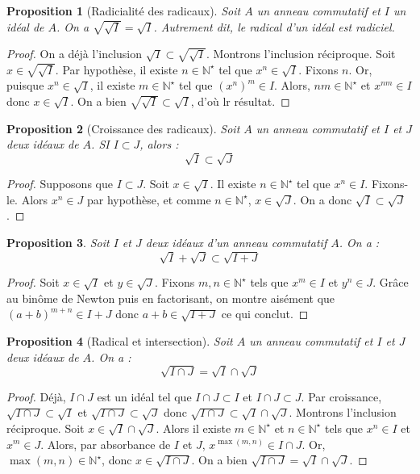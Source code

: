 \documentclass[french]{book}
\newcommand{\N}{\mathbb{N}}
\newcommand{\st}{^\star}
\theoremstyle{plain}
\newtheorem{prop}{Proposition}[chapter]
\theoremstyle{definition}
\theoremstyle{remark}
\begin{document}
\begin{prop}[Radicialité des radicaux]
	Soit $A$ un anneau commutatif et $I$ un idéal de $A$. On a $\sqrt{\sqrt{I}}=\sqrt{I}$. Autrement dit, le radical d'un idéal est radiciel.
\end{prop}
\begin{proof}
	On a déjà l'inclusion $\sqrt{I}\subset\sqrt{\sqrt{I}}$. Montrons l'inclusion réciproque. Soit $x\in\sqrt{\sqrt{I}}$. Par hypothèse, il existe $n\in\N\st$ tel que $x^n\in\sqrt{I}$. Fixons $n$. Or, puisque $x^n\in\sqrt{I}$, il existe $m\in\N\st$ tel que $(x^n)^m\in I$. Alors, $nm\in\N\st$ et $x^{nm}\in I$ donc $x\in\sqrt{I}$. On a bien $\sqrt{\sqrt{I}}\subset\sqrt{I}$, d'où lr résultat.
\end{proof}
\begin{prop}[Croissance des radicaux]
	Soit $A$ un anneau commutatif et $I$ et $J$ deux idéaux de $A$. SI $I\subset J$, alors : $$\sqrt{I}\subset\sqrt{J}$$
\end{prop}
\begin{proof}
	Supposons que $I\subset J$. Soit $x\in \sqrt{I}$. Il existe $n\in\N\st$ tel que $x^n\in I$. Fixons-le. Alors $x^n\in J$ par hypothèse, et comme $n\in\N\st$, $x\in\sqrt{J}$. On a donc $\sqrt{I}\subset\sqrt{J}$.
\end{proof}
\begin{prop}
	Soit $I$ et $J$ deux idéaux d'un anneau commutatif $A$. On a : $$\sqrt{I}+\sqrt{J}\subset\sqrt{I+J}$$
\end{prop}
\begin{proof}
	Soit $x\in\sqrt{I}$ et $y\in\sqrt{J}$. Fixons $m,n\in\N\st$ tels que $x^m\in I$ et $y^n\in J$. Grâce au binôme de Newton puis en factorisant, on montre aisément que $(a+b)^{m+n}\in I+J$ donc $a+b\in\sqrt{I+J}$ ce qui conclut.
\end{proof}
\begin{prop}[Radical et intersection]
	Soit $A$ un anneau commutatif et $I$ et $J$ deux idéaux de $A$. On a : $$\sqrt{I\cap J}=\sqrt{I}\cap\sqrt{J}$$
\end{prop}
\begin{proof}
	Déjà, $I\cap J$ est un idéal tel que $I\cap J\subset I$ et $I\cap J\subset J$. Par croissance, $\sqrt{I\cap J}\subset\sqrt{I}$ et $\sqrt{I\cap J}\subset\sqrt{J}$ donc $\sqrt{I\cap J}\subset\sqrt{I}\cap\sqrt{J}$. Montrons l'inclusion réciproque. Soit $x\in\sqrt{I}\cap\sqrt{J}$. Alors il existe $m\in\N\st$ et $n\in\N\st$ tels que $x^n\in I$ et $x^m\in J$. Alors, par absorbance de $I$ et $J$, $x^{\max(m,n)}\in I\cap J$. Or, $\max(m,n)\in\N\st$, donc $x\in\sqrt{I\cap J}$. On a bien $\sqrt{I\cap J}=\sqrt{I}\cap\sqrt{J}$.
\end{proof}
\end{document}
